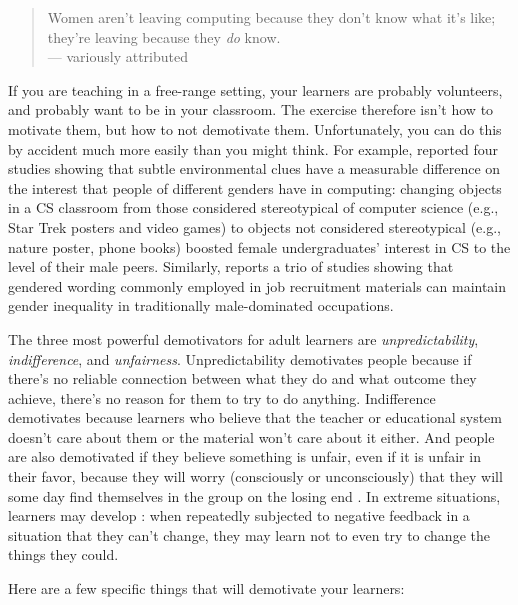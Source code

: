 
\begin{quote}

  Women aren't leaving computing because they don't know what it's like;
  they're leaving because they \emph{do} know. \\
  --- variously attributed

\end{quote}

If you are teaching in a free-range setting, your learners are probably
volunteers, and probably want to be in your classroom. The exercise
therefore isn't how to motivate them, but how to not demotivate them.
Unfortunately, you can do this by accident much more easily than you
might think. For example, \cite{Cher2009} reported four studies
showing that subtle environmental clues have a measurable difference on
the interest that people of different genders have in computing:
changing objects in a CS classroom from those considered stereotypical
of computer science (e.g., Star Trek posters and video games) to objects
not considered stereotypical (e.g., nature poster, phone books) boosted
female undergraduates' interest in CS to the level of their male peers.
Similarly, \cite{Gauc2011} reports a trio of studies showing that
gendered wording commonly employed in job recruitment materials can
maintain gender inequality in traditionally male-dominated occupations.

The three most powerful demotivators for adult learners are
\emph{unpredictability}, \emph{indifference}, and \emph{unfairness}. Unpredictability
demotivates people because if there's no reliable connection between
what they do and what outcome they achieve, there's no reason for them
to try to do anything. Indifference demotivates because learners who
believe that the teacher or educational system doesn't care about them
or the material won't care about it either. And people are also
demotivated if they believe something is unfair, even if it is unfair in
their favor, because they will worry (consciously or unconsciously) that
they will some day find themselves in the group on the losing end
\cite{Wilk2011}. In extreme situations, learners may develop
: when
repeatedly subjected to negative feedback in a situation that they can't
change, they may learn not to even try to change the things they could.

Here are a few specific things that will demotivate your learners:


